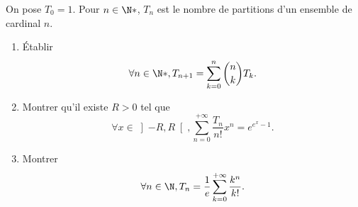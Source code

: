 \begin{enonce}
\begin{exercise}[ID={RMS127 E745},subtitle={Mines-Ponts PSI 2016},tags={}, difficulty={0}]
On pose $T_0=1$.
Pour $n\in\N*$, $T_n$ est le nombre de partitions d'un ensemble de cardinal $n$.
\begin{enumerate}
  \item Établir
    \begin{equation*}
      \forall n\in\N*, T_{n+1} = \sum_{k=0}^n \binom nk T_k.
    \end{equation*}

  \item Montrer qu'il existe $R>0$ tel que
    \begin{equation*}
      \forall x\in\left]-R,R\right[, \sum_{n=0}^{+\infty} \frac{T_n}{n!} x^n = e^{e^x - 1}.
    \end{equation*}

  \item Montrer
    \begin{equation*}
      \forall n\in\N, T_n = \frac1e \sum_{k=0}^{+\infty} \frac{k^n}{k!}.
    \end{equation*}
    
    
\end{enumerate}
\end{exercise}
\begin{solution}
\end{solution}
\end{enonce}
